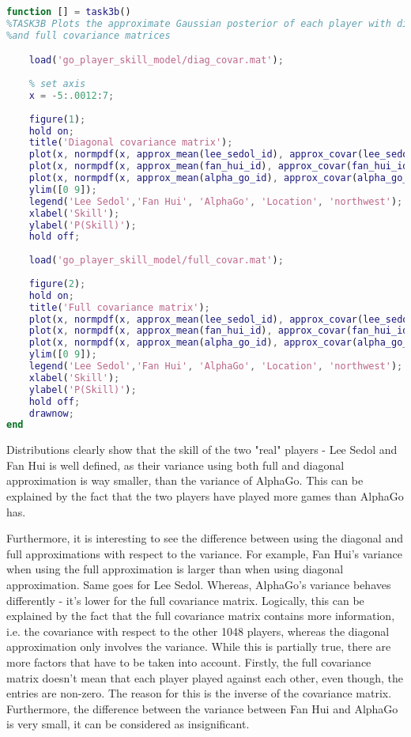 \documentclass[a4paper,11pt]{article}
\theoremstyle{mytheor}
\begin{document}
\begin{lstlisting}[label={list:3b},caption=Code for plotting approximate marginal posterior using full and diagonal approximations,language=MATLAB]
function [] = task3b()
%TASK3B Plots the approximate Gaussian posterior of each player with diagonal
%and full covariance matrices

    load('go_player_skill_model/diag_covar.mat');
    
    % set axis
    x = -5:.0012:7;
    
    figure(1);
    hold on;
    title('Diagonal covariance matrix');
    plot(x, normpdf(x, approx_mean(lee_sedol_id), approx_covar(lee_sedol_id)^0.5),'-r');
    plot(x, normpdf(x, approx_mean(fan_hui_id), approx_covar(fan_hui_id)^0.5),'--g');
    plot(x, normpdf(x, approx_mean(alpha_go_id), approx_covar(alpha_go_id)^0.5),'-.b');
    ylim([0 9]);
    legend('Lee Sedol','Fan Hui', 'AlphaGo', 'Location', 'northwest');
    xlabel('Skill');
    ylabel('P(Skill)');
    hold off;
    
    load('go_player_skill_model/full_covar.mat');
    
    figure(2);
    hold on;
    title('Full covariance matrix');
    plot(x, normpdf(x, approx_mean(lee_sedol_id), approx_covar(lee_sedol_id,lee_sedol_id)^0.5),'-r');
    plot(x, normpdf(x, approx_mean(fan_hui_id), approx_covar(fan_hui_id,fan_hui_id)^0.5),'--g');
    plot(x, normpdf(x, approx_mean(alpha_go_id), approx_covar(alpha_go_id,alpha_go_id)^0.5),'-.b');
    ylim([0 9]);
    legend('Lee Sedol','Fan Hui', 'AlphaGo', 'Location', 'northwest');
    xlabel('Skill');
    ylabel('P(Skill)');
    hold off;
    drawnow;
end

\end{lstlisting}

Distributions clearly show that the skill of the two "real" players - Lee Sedol and Fan Hui is well defined, as their variance using both full and diagonal approximation is way smaller, than the variance of AlphaGo. This can be explained by the fact that the two players have played more games than AlphaGo has.

Furthermore, it is interesting to see the difference between using the diagonal and full approximations with respect to the variance. For example, Fan Hui's variance when using the full approximation is larger than when using diagonal approximation. Same goes for Lee Sedol. Whereas, AlphaGo's variance behaves differently - it's lower for the full covariance matrix. Logically, this can be explained by the fact that the full covariance matrix contains more information, i.e. the covariance with respect to the other 1048 players, whereas the diagonal approximation only involves the variance. While this is partially true, there are more factors that have to be taken into account. Firstly, the full covariance matrix doesn't mean that each player played against each other, even though, the entries are non-zero. The reason for this is the inverse of the covariance matrix. Furthermore, the difference between the variance between Fan Hui and AlphaGo is very small, it can be considered as insignificant.
\end{document}
